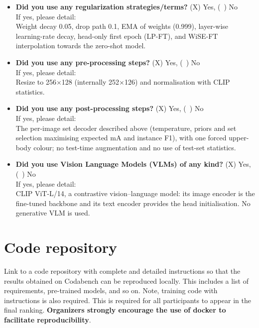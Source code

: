 \documentclass[a4paper, 10pt, conference]{ieeeconf}
\begin{document}
\begin{itemize}
\item \textbf{Did you use any regularization strategies/terms?} (X) Yes, (~) No\\
If yes, please detail:\\
%
%
Weight decay 0.05, drop path 0.1, EMA of weights (0.999), layer-wise learning-rate decay, head-only first epoch (LP-FT), and WiSE-FT interpolation towards the zero-shot model.


\item \textbf{Did you use any pre-processing steps?} (X) Yes, (~) No\\
If yes, please detail:\\
%
%
Resize to 256$\times$128 (internally 252$\times$126) and normalisation with CLIP statistics.


\item \textbf{Did you use any post-processing steps?} (X) Yes, (~) No\\
If yes, please detail:\\
%
%
The per-image set decoder described above (temperature, priors and set selection maximising expected mA and instance F1), with one forced upper-body colour; no test-time augmentation and no use of test-set statistics.


\item \textbf{Did you use Vision Language Models (VLMs) of any kind?} (X) Yes, (~) No\\
If yes, please detail:\\
%
%
CLIP ViT-L/14, a contrastive vision--language model: its image encoder is the fine-tuned backbone and its text encoder provides the head initialisation. No generative VLM is used.
\end{itemize}



\section{Code repository}
Link to a code repository with complete and detailed instructions so that the results obtained on Codabench can be reproduced locally. This includes a list of requirements, pre-trained models, and so on. Note, training code with instructions is also required. This is required for all participants to appear in the final ranking. \textbf{Organizers strongly encourage the use of docker to facilitate reproducibility}. \\
\end{document}
